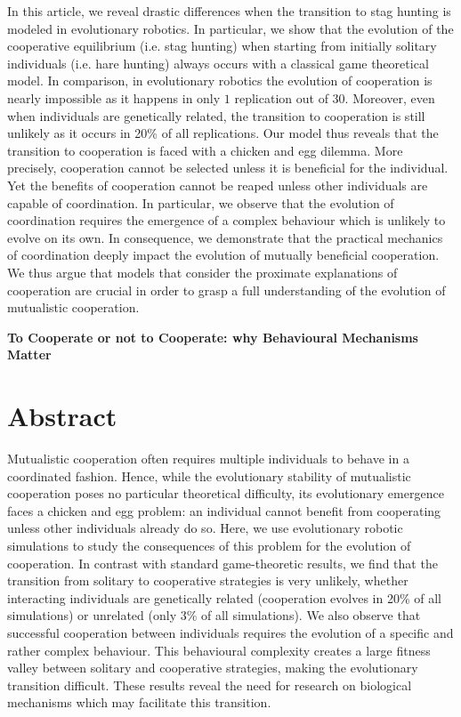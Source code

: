 In this article, we reveal drastic differences when the transition to stag hunting is modeled in evolutionary robotics. In particular, we show that the evolution of the cooperative equilibrium (i.e. stag hunting) when starting from initially solitary individuals (i.e. hare hunting) always occurs with a classical game theoretical model. In comparison, in evolutionary robotics the evolution of cooperation is nearly impossible as it happens in only $1$ replication out of $30$. Moreover, even when individuals are genetically related, the transition to cooperation is still unlikely as it occurs in 20\% of all replications. Our model thus reveals that the transition to cooperation is faced with a chicken and egg dilemma. More precisely, cooperation cannot be selected unless it is beneficial for the individual. Yet the benefits of cooperation cannot be reaped unless other individuals are capable of coordination. In particular, we observe that the evolution of coordination requires the emergence of a complex behaviour which is unlikely to evolve on its own. In consequence, we demonstrate that the practical mechanics of coordination deeply impact the evolution of mutually beneficial cooperation. We thus argue that models that consider the proximate explanations of cooperation are crucial in order to grasp a full understanding of the evolution of mutualistic cooperation.

\clearpage

\begin{flushleft}
\textbf{\Huge To Cooperate or not to Cooperate: why Behavioural Mechanisms Matter}
\end{flushleft}


\section{Abstract}
  Mutualistic cooperation often requires multiple individuals to behave in a coordinated fashion. Hence, while the evolutionary stability of mutualistic cooperation poses no particular theoretical difficulty, its evolutionary emergence faces a chicken and egg problem: an individual cannot benefit from cooperating unless other individuals already do so. Here, we use evolutionary robotic simulations to study the consequences of this problem for the evolution of cooperation. In contrast with standard game-theoretic results, we find that the transition from solitary to cooperative strategies is very unlikely, whether interacting individuals are genetically related (cooperation evolves in 20\% of all simulations) or unrelated (only 3\% of all simulations). We also observe that successful cooperation between individuals requires the evolution of a specific and rather complex behaviour. This behavioural complexity creates a large fitness valley between solitary and cooperative strategies, making the evolutionary transition difficult. These results reveal the need for research on biological mechanisms which may facilitate this transition.


